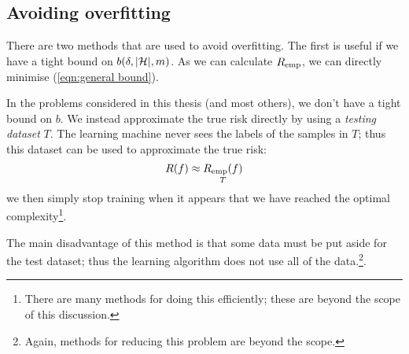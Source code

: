 \subsection{Avoiding overfitting}

There are two methods that are used to avoid overfitting.  The first
is useful if we have a tight bound on $b(\delta, |\mathcal{H}|, m)$.  As we
can calculate $R_{\mathrm{emp}}$, we can directly minimise (\ref{eqn:general
bound}).

In the problems considered in this thesis (and most others), we don't
have a tight bound on $b$.  We instead approximate the true risk
directly by using a \emph{testing dataset} $T$.  The learning machine
never sees the labels of the samples in $T$; thus this dataset can be
used to approximate the true risk: 
%
\begin{equation}
R(f) \approx \underset{T}{R_{\mathrm{emp}}(f)}
\end{equation}
%
we then simply stop training when it appears that we have reached the
optimal complexity\footnote{There are many methods for doing this efficiently;
these are beyond the scope of this discussion.}.

The main disadvantage of this method is that some data must be put
aside for the test dataset; thus the learning algorithm does not use
all of the data.\footnote{Again, methods for reducing this problem are
beyond the scope.}.
